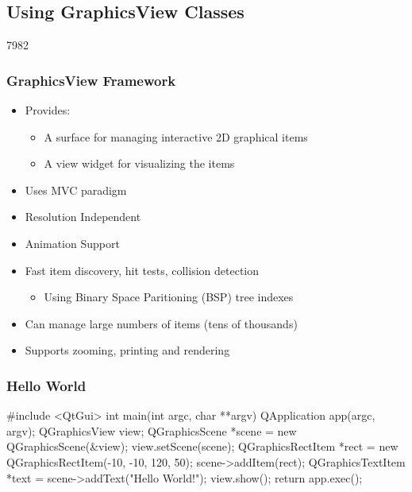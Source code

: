 \subsection{Using GraphicsView Classes}
\begin{slide}{7982}
\frametitle{GraphicsView Framework}
\begin{itemize}
\item Provides:
    \begin{itemize}
    \item A surface for managing interactive 2D graphical items
    \item A view widget for visualizing the items
    \end{itemize}
\item Uses MVC paradigm
\item Resolution Independent
\item Animation Support
\item Fast item discovery, hit tests, collision detection
    \begin{itemize}
    \item Using Binary Space Paritioning (BSP) tree indexes
    \end{itemize}
\item Can manage large numbers of items (tens of thousands)
\item Supports zooming, printing and rendering

\end{itemize}
\end{slide}


\begin{slide}[fragile]
\frametitle{Hello World}

\begin{cpp}
#include <QtGui>
int main(int argc, char **argv) {
  QApplication app(argc, argv);
  QGraphicsView view;
  QGraphicsScene *scene = new QGraphicsScene(&view);
  view.setScene(scene);
  QGraphicsRectItem *rect = 
      new QGraphicsRectItem(-10, -10, 120, 50);
  scene->addItem(rect);
  QGraphicsTextItem *text = scene->addText("Hello World!");
  view.show();
  return app.exec();
}
\end{cpp}
 \\

\end{slide}

